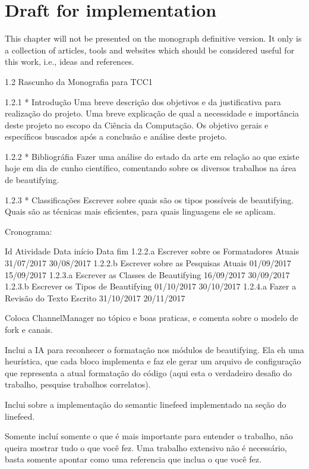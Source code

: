 

\chapter{Draft for implementation}

This chapter will not be presented on the monograph definitive version.
It only is a collection of articles,
tools and websites which should be considered useful for this work, i.e., ideas and references.

1.2      Rascunho da Monografia para TCC1

1.2.1    * Introdução       Uma breve descrição dos objetivos e da
           justificativa para realização do projeto. Uma breve explicação de
           qual a necessidade e importância deste projeto no escopo da
           Ciência da Computação. Os objetivo gerais e específicos buscados
           após a conclusão e análise deste projeto.

1.2.2    * Bibliográfia     Fazer uma análise do estado da arte em relação
         ao que existe hoje em dia de cunho científico, comentando sobre os
         diversos trabalhos na área de beautifying.

1.2.3    * Classificações   Escrever sobre quais são os tipos possíveis de
         beautifying. Quais são as técnicas mais eficientes, para quais
         linguagens ele se aplicam.

Cronograma:

Id      Atividade                               Data início    Data fim
1.2.2.a Escrever sobre os Formatadores Atuais   31/07/2017     30/08/2017
1.2.2.b Escrever sobre as Pesquisas Atuais      01/09/2017     15/09/2017
1.2.3.a Escrever as Classes de Beautifying      16/09/2017     30/09/2017
1.2.3.b Escrever os Tipos de Beautifying        01/10/2017     30/10/2017
1.2.4.a Fazer a Revisão do Texto Escrito        31/10/2017     20/11/2017

Coloca ChannelManager no tópico e boas praticas, e comenta sobre o modelo de
fork e canais.

Inclui a IA para reconhecer o formatação nos módulos de beautifying. Ela eh
uma heurística, que cada bloco implementa e faz ele gerar um arquivo de
configuração que representa a atual formatação do código (aqui esta o
verdadeiro desafio do trabalho, pesquise trabalhos correlatos).

Inclui sobre a implementação  do semantic linefeed implementado na seção do
linefeed.

Somente incluí somente o que é mais importante para entender o trabalho, não
queira mostrar tudo o que você fez. Uma trabalho extensivo não é necessário,
basta somente apontar como uma referencia que inclua o que você fez.

